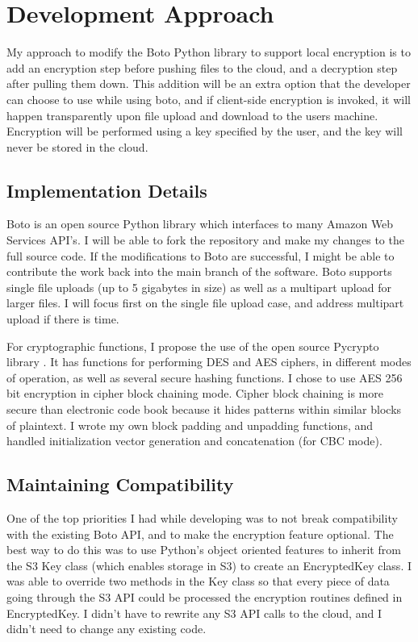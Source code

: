 \section{Development Approach}

My approach to modify the Boto Python library to support local encryption is to add an encryption step before pushing files
to the cloud, and a decryption step after pulling them down.
This addition will be an extra option that the developer can choose to use while using boto, and if client-side encryption
is invoked, it will happen transparently upon file upload and download to the users machine. Encryption will be performed
using a key specified by the user, and the key will never be stored in the cloud.

\subsection{Implementation Details}

Boto is an open source Python library which interfaces to many Amazon Web Services API's. I will be able to fork the repository and make my changes to the full source code.
If the modifications to Boto are successful, I might be able to contribute the work back into the main branch of the software.
Boto supports single file uploads (up to 5 gigabytes in size) as well as a multipart upload for larger files. I will focus first on the single file upload case, and address multipart upload if there is time.

For cryptographic functions, I propose the use of the open source Pycrypto library \cite{pycrypto}. It has functions 
for performing DES and AES ciphers, in different modes of operation, as well as several secure hashing functions. I chose to 
use AES 256 bit encryption in cipher block chaining mode. Cipher block chaining is more secure than electronic code book 
because it hides patterns within similar blocks of plaintext. I wrote my own block padding and unpadding functions, and handled initialization vector generation and concatenation (for CBC mode).

\subsection{Maintaining Compatibility}
One of the top priorities I had while developing was to not break compatibility with the existing Boto API, and to make the 
encryption feature optional. The best way to do this was to use Python's object oriented features to inherit from the S3 Key class 
(which enables storage in S3) to create an EncryptedKey class. I was able to override two methods in the Key class so 
that every piece of data going through the S3 API could be processed the encryption routines defined in EncryptedKey. I didn't have to rewrite any S3 API calls to the cloud, and I didn't need to change any existing code.

